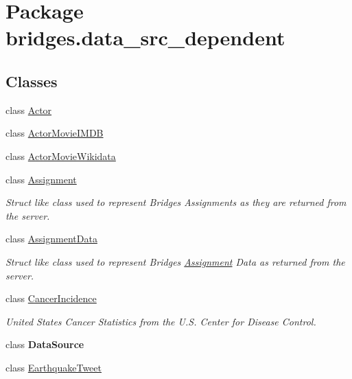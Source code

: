 \hypertarget{namespacebridges_1_1data__src__dependent}{}\section{Package bridges.\+data\+\_\+src\+\_\+dependent}
\label{namespacebridges_1_1data__src__dependent}
\subsection*{Classes}
\begin{DoxyCompactItemize}
\item 
class \mbox{\hyperlink{classbridges_1_1data__src__dependent_1_1_actor}{Actor}}
\item 
class \mbox{\hyperlink{classbridges_1_1data__src__dependent_1_1_actor_movie_i_m_d_b}{Actor\+Movie\+I\+M\+DB}}
\item 
class \mbox{\hyperlink{classbridges_1_1data__src__dependent_1_1_actor_movie_wikidata}{Actor\+Movie\+Wikidata}}
\item 
class \mbox{\hyperlink{classbridges_1_1data__src__dependent_1_1_assignment}{Assignment}}
\begin{DoxyCompactList}\small\item\em Struct like class used to represent Bridges Assignments as they are returned from the server. \end{DoxyCompactList}\item 
class \mbox{\hyperlink{classbridges_1_1data__src__dependent_1_1_assignment_data}{Assignment\+Data}}
\begin{DoxyCompactList}\small\item\em Struct like class used to represent Bridges \mbox{\hyperlink{classbridges_1_1data__src__dependent_1_1_assignment}{Assignment}} Data as returned from the server. \end{DoxyCompactList}\item 
class \mbox{\hyperlink{classbridges_1_1data__src__dependent_1_1_cancer_incidence}{Cancer\+Incidence}}
\begin{DoxyCompactList}\small\item\em United States Cancer Statistics from the U.\+S. Center for Disease Control. \end{DoxyCompactList}\item 
class {\bfseries Data\+Source}
\item 
class \mbox{\hyperlink{classbridges_1_1data__src__dependent_1_1_earthquake_tweet}{Earthquake\+Tweet}}

\end{DoxyCompactItemize}
